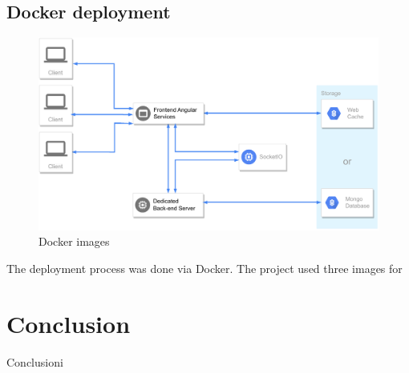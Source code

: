 \documentclass[multi, tikz]{article}
\begin{document}
\subsection{Docker deployment}
 

\begin{figure}[h!]
  \centering
  \includegraphics[scale=0.70]{diagrams/architecture.drawio.pdf}
  \caption{Docker images}
  \label{fig:deathstar}
\end{figure}


The deployment process was done via Docker. The project used three images for

\section{Conclusion}
Conclusioni



\end{document}
